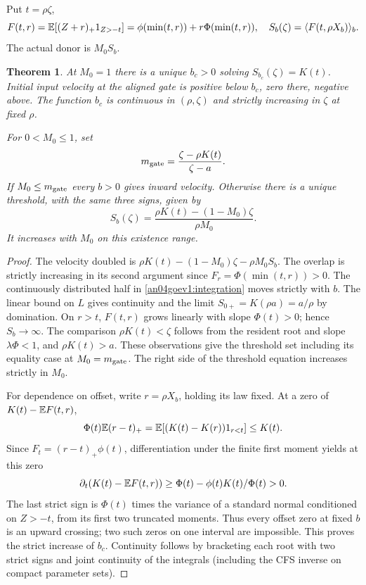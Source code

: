 \documentclass[11pt]{article}
\newtheorem{theorem}{Theorem}\newtheorem{lemma}{Lemma}
\begin{document}
Put \(t=\rho\zeta\),
\[
 F(t,r)=\mathbb E[(Z+r)_+1_{Z>-t}]
       =\phi(\min(t,r))+r\Phi(\min(t,r)),\quad
 S_b(\zeta)=\langle F(t,\rho X_b)\rangle_b .
\]
The actual donor is \(M_0 S_b\).
\begin{theorem}\label{an04goev1:threshold}
At \(M_0=1\) there is a unique \(b_c>0\) solving
\(S_{b_c}(\zeta)=K(t)\). Initial input velocity at the aligned gate
is positive below \(b_c\), zero there, negative above. The function
\(b_c\) is continuous in \((\rho,\zeta)\) and strictly increasing in
\(\zeta\) at fixed \(\rho\).

For \(0<M_0\le1\), set
\[
 m_{\rm gate}=\frac{\zeta-\rho K(t)}{\zeta-a}.
\]
If \(M_0\le m_{\rm gate}\) every \(b>0\) gives inward velocity.
Otherwise there is a unique threshold, with the same three signs,
given by
\[
 S_b(\zeta)=\frac{\rho K(t)-(1-M_0)\zeta}{\rho M_0}.
\]
It increases with \(M_0\) on this existence range.
\end{theorem}
\begin{proof}
The velocity doubled is \(\rho K(t)-(1-M_0)\zeta-\rho M_0 S_b\).
The overlap is strictly increasing in its second argument since
\(F_r=\Phi(\min(t,r))>0\). The continuously distributed half
in \eqref{an04goev1:integration} moves strictly with \(b\).
The linear bound on \(L\) gives continuity and the limit
\(S_{0+}=K(\rho a)=a/\rho\) by domination. On \(r>t\), \(F(t,r)\)
grows linearly with slope \(\Phi(t)>0\); hence \(S_b\to\infty\).
The comparison \(\rho K(t)<\zeta\) follows from the resident root
and slope \(\lambda\Phi<1\), and \(\rho K(t)>a\).
These observations give the threshold set including its equality
case at \(M_0=m_{\rm gate}\). The right side of the threshold
equation increases strictly in \(M_0\).

For dependence on offset, write \(r=\rho X_b\), holding its law fixed.
At a zero of \(K(t)-\mathbb E F(t,r)\),
\[
 \Phi(t)\mathbb E(r-t)_+=\mathbb E[(K(t)-K(r))1_{r<t}]\le K(t).
\]
Since \(F_t=(r-t)_+\phi(t)\), differentiation under the finite first
moment yields at this zero
\[
 \partial_t(K(t)-\mathbb E F(t,r))\ge
 \Phi(t)-\phi(t)K(t)/\Phi(t)>0 .
\]
The last strict sign is \(\Phi(t)\) times the variance of a standard
normal conditioned on \(Z>-t\), from its first two truncated moments.
Thus every offset zero at fixed \(b\) is an upward crossing; two such
zeros on one interval are impossible. This proves the strict increase
of \(b_c\). Continuity follows by bracketing each root with two
strict signs and joint continuity of the integrals (including the
CFS inverse on compact parameter sets).
\end{proof}
\end{document}
